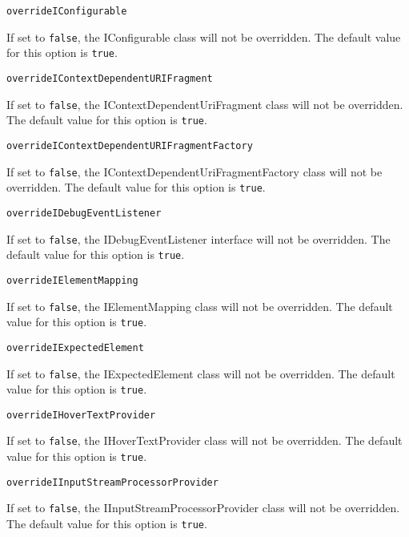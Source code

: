 \noindent\texttt{overrideIConfigurable}
\begin{myindentpar}{1cm}
If set to \texttt{false}, the IConfigurable class will not be overridden. The default value for this option is \texttt{true}.
\end{myindentpar}

\noindent\texttt{overrideIContextDependentURIFragment}
\begin{myindentpar}{1cm}
If set to \texttt{false}, the IContextDependentUriFragment class will not be overridden. The default value for this option is \texttt{true}.
\end{myindentpar}

\noindent\texttt{overrideIContextDependentURIFragmentFactory}
\begin{myindentpar}{1cm}
If set to \texttt{false}, the IContextDependentUriFragmentFactory class will not be overridden. The default value for this option is \texttt{true}.
\end{myindentpar}

\noindent\texttt{overrideIDebugEventListener}
\begin{myindentpar}{1cm}
If set to \texttt{false}, the IDebugEventListener interface will not be overridden. The default value for this option is \texttt{true}.
\end{myindentpar}

\noindent\texttt{overrideIElementMapping}
\begin{myindentpar}{1cm}
If set to \texttt{false}, the IElementMapping class will not be overridden. The default value for this option is \texttt{true}.
\end{myindentpar}

\noindent\texttt{overrideIExpectedElement}
\begin{myindentpar}{1cm}
If set to \texttt{false}, the IExpectedElement class will not be overridden. The default value for this option is \texttt{true}.
\end{myindentpar}

\noindent\texttt{overrideIHoverTextProvider}
\begin{myindentpar}{1cm}
If set to \texttt{false}, the IHoverTextProvider class will not be overridden. The default value for this option is \texttt{true}.
\end{myindentpar}

\noindent\texttt{overrideIInputStreamProcessorProvider}
\begin{myindentpar}{1cm}
If set to \texttt{false}, the IInputStreamProcessorProvider class will not be overridden. The default value for this option is \texttt{true}.
\end{myindentpar}

